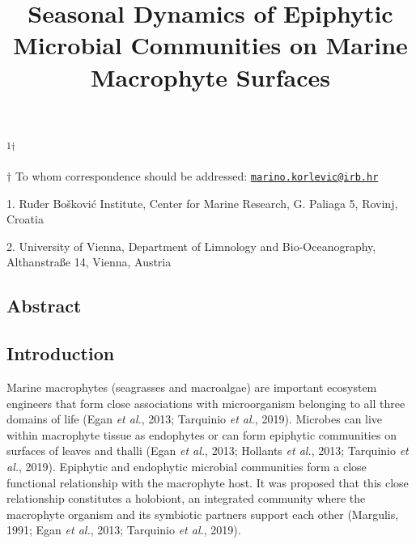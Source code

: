 \documentclass[12pt,]{article}
\title{\textbf{Seasonal Dynamics of Epiphytic Microbial Communities on Marine
Macrophyte Surfaces}}
\author{}
\date{}
\begin{document}
\maketitle

\vspace{70mm}

\textsuperscript{1\(\dagger\)}

\vspace{40mm}

\(\dagger\) To whom correspondence should be addressed:
\href{mailto:marino.korlevic@irb.hr}{\nolinkurl{marino.korlevic@irb.hr}}

1. Ruđer Bošković Institute, Center for Marine Research, G. Paliaga 5,
Rovinj, Croatia

2. University of Vienna, Department of Limnology and Bio-Oceanography,
Althanstraße 14, Vienna, Austria \newpage \linenumbers
{} \setlength\parindent{24pt}

\hypertarget{abstract}{%
\subsection{Abstract}\label{abstract}}

\newpage

\hypertarget{introduction}{%
\subsection{Introduction}\label{introduction}}

Marine macrophytes (seagrasses and macroalgae) are important ecosystem
engineers that form close associations with microorganism belonging to
all three domains of life (Egan \emph{et al.}, 2013; Tarquinio \emph{et
al.}, 2019). Microbes can live within macrophyte tissue as endophytes or
can form epiphytic communities on surfaces of leaves and thalli (Egan
\emph{et al.}, 2013; Hollants \emph{et al.}, 2013; Tarquinio \emph{et
al.}, 2019). Epiphytic and endophytic microbial communities form a close
functional relationship with the macrophyte host. It was proposed that
this close relationship constitutes a holobiont, an integrated community
where the macrophyte organism and its symbiotic partners support each
other (Margulis, 1991; Egan \emph{et al.}, 2013; Tarquinio \emph{et
al.}, 2019).
\end{document}
